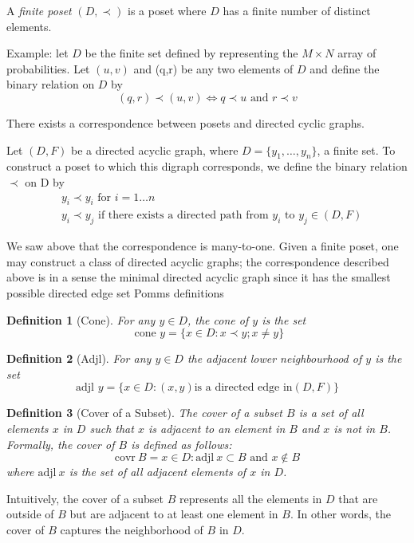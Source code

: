 \documentclass[11pt]{amsart}
\newtheorem{definition}{Definition}
\begin{document}
A \textit{finite poset} $(D,\prec)$ is a poset where $D$ has a finite number of distinct elements. 

Example: let $D$ be the finite set defined by representing the $M \times N$ array of probabilities. Let $(u,v)$ and (q,r) be any two elements of $D$ and define the binary relation on $D$ by
\begin{equation}
(q,r) \prec (u,v) \iff q \prec u \text{ and } r \prec v
\end{equation}

There exists a correspondence between posets and directed cyclic graphs. 

Let $(D, F)$ be a directed acyclic graph, where $D = \{y_1, \ldots, y_n\}$, a finite set. To construct a poset to which this digraph corresponds, we define the binary relation $\prec$ on D by
\begin{align}
&y_i \prec y_i \text{ for } i= 1\dots n \\ 
&y_i \prec y_j \text{ if there exists a directed path from } y_i \text{ to } y_j \in (D,F)
\end{align}

We saw above that the correspondence is many-to-one. Given a finite poset, one may construct a class of directed acyclic graphs; the correspondence described above is in a sense the minimal directed acyclic graph since it has the smallest possible directed edge set
Pomms definitions 


\begin{definition}[Cone]
For any $y \in D$, the \textit{cone} of $y$ is the set
\begin{equation}
\text{ cone } y = \{x \in D: x\prec y;x\neq y \} \nonumber
\end{equation}
\end{definition}

\begin{definition}[Adjl]
For any $y \in D$ the \textit{adjacent lower neighbourhood} of $y$ is the set $$
\text{adjl } y = \{ x \in D:(x,y) \text{is a directed edge in} (D,F)\}
$$
\end{definition}




\begin{definition}[Cover of a Subset]
The cover of a subset $B$ is a set of all elements $x$ in $D$ such that $x$ is adjacent to an element in $B$ and $x$ is not in $B$. Formally, the cover of $B$ is defined as follows:
\begin{equation}
\text{covr}\ B = { x \in D: \text{adjl}\ x \subset B \text{ and } x \notin B } \nonumber
\end{equation}
where $\text{adjl}\ x$ is the set of all adjacent elements of $x$ in $D$.
\end{definition}
Intuitively, the cover of a subset $B$ represents all the elements in $D$ that are outside of $B$ but are adjacent to at least one element in $B$. In other words, the cover of $B$ captures the neighborhood of $B$ in $D$.
\end{document}
